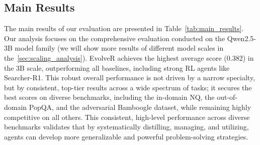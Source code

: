 \subsection{Main Results}
\label{sec:main_results}
The main results of our evaluation are presented in Table~\ref{tab:main_results}. Our analysis focuses on the comprehensive evaluation conducted on the Qwen2.5-3B model family (we will show more results of different model scales in the~\ref{sec:scaling_analysis}). EvolveR achieves the highest average score (0.382) in the 3B scale, outperforming all baselines, including strong RL agents like Searcher-R1. This robust overall performance is not driven by a narrow specialty, but by consistent, top-tier results across a wide spectrum of tasks; it secures the best scores on diverse benchmarks, including the in-domain NQ, the out-of-domain PopQA, and the adversarial Bamboogle dataset, while remaining highly competitive on all others. 
This consistent, high-level performance across diverse benchmarks validates that by systematically distilling, managing, and utilizing, agents can develop more generalizable and powerful problem-solving strategies.




